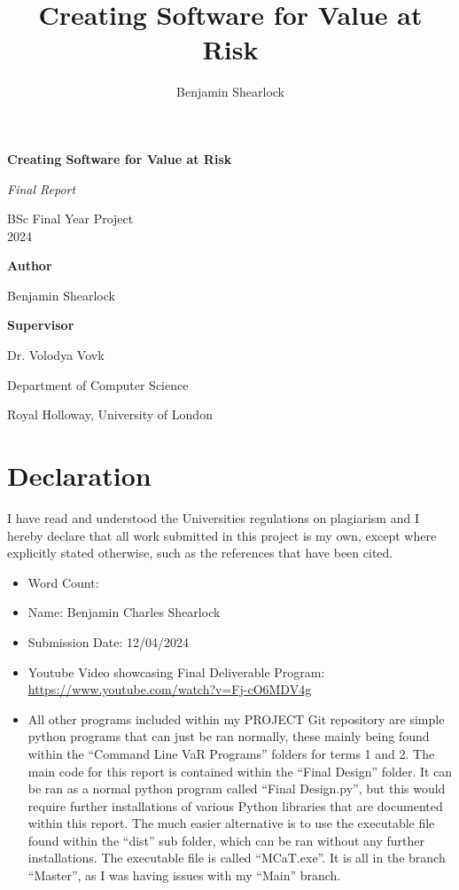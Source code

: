 \documentclass{article}
\title{Creating Software for Value at Risk}
\author{Benjamin Shearlock}
\begin{document}
\raggedright

\begin{titlepage}
  \begin{center}
    \vspace*{1cm}
    {\LARGE \textbf{Creating Software for Value at Risk} \par} 
    \vspace{1.5cm}
    {\Large \textit{Final Report} \par}
    \vspace{0.5cm}
    {\Large BSc Final Year Project \\ 2024 \par}
    \vspace{2cm}
    {\large \textbf{Author} \par}
    {\large Benjamin Shearlock \par}
    \vspace{2cm}
    {\large \textbf{Supervisor} \par}
    {\large Dr. Volodya Vovk \par}
    \vfill
    {\large Department of Computer Science \par}
    {\large Royal Holloway, University of London \par}
  \end{center}
\end{titlepage}

\setlength{\parindent}{0pt}

\section*{Declaration}
I have read and understood the Universities regulations on plagiarism and I hereby declare that all work submitted in this project is my own, except where explicitly stated otherwise, such as the references that have been cited. \\

\begin{itemize}
  \item Word Count:
  \item Name: Benjamin Charles Shearlock
  \item Submission Date: 12/04/2024
  \item Youtube Video showcasing Final Deliverable Program: \url{https://www.youtube.com/watch?v=Fj-cO6MDV4g}
  \item All other programs included within my PROJECT Git repository are simple python programs that can just be ran normally, these mainly being found within the ``Command Line VaR Programs'' folders for terms 1 and 2. The main code for this report is contained within the ``Final Design'' folder. It can be ran as a normal python program called ``Final Design.py'', but this would require further installations of various Python libraries that are documented within this report. The much easier alternative is to use the executable file found within the ``dist'' sub folder, which can be ran without any further installations. The executable file is called ``MCaT.exe''. It is all in the branch “Master”, as I was having issues with my “Main” branch.


\end{itemize}
\end{document}
